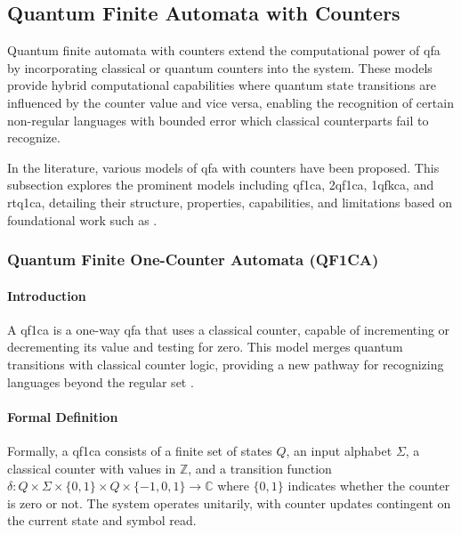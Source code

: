 \subsection{Quantum Finite Automata with Counters}
\label{sec:qfa-with-counters}

Quantum finite automata with counters extend the computational power of \gls{qfa} by incorporating classical or quantum counters into the system. These models provide hybrid computational capabilities where quantum state transitions are influenced by the counter value and vice versa, enabling the recognition of certain non-regular languages with bounded error which classical counterparts fail to recognize.

In the literature, various models of \gls{qfa} with counters have been proposed. This subsection explores the prominent models including \gls{qf1ca}, \gls{2qf1ca}, \gls{1qfkca}, and \gls{rtq1ca}, detailing their structure, properties, capabilities, and limitations based on foundational work such as \cite{bonner2001quantum, kravtsev1999quantum, pani2011empowering, cem2012quantum}.

\subsubsection{Quantum Finite One-Counter Automata (QF1CA)}

\paragraph{Introduction} 
A \gls{qf1ca} is a one-way \gls{qfa} that uses a classical counter, capable of incrementing or decrementing its value and testing for zero. This model merges quantum transitions with classical counter logic, providing a new pathway for recognizing languages beyond the regular set \cite{kravtsev1999quantum}.

\paragraph{Formal Definition} 
Formally, a \gls{qf1ca} consists of a finite set of states $Q$, an input alphabet $\Sigma$, a classical counter with values in $\mathbb{Z}$, and a transition function $\delta: Q \times \Sigma \times \{0,1\} \times Q \times \{-1,0,1\} \rightarrow \mathbb{C}$ where $\{0,1\}$ indicates whether the counter is zero or not. The system operates unitarily, with counter updates contingent on the current state and symbol read.

